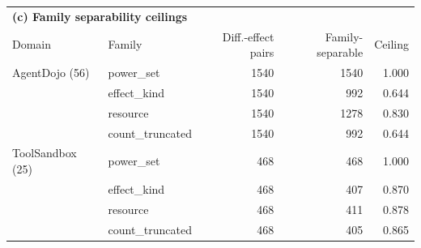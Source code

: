 \begin{table}[t]
\par\vspace{2mm}
\begin{tabular}{llrrr}
\toprule
\multicolumn{5}{l}{\textbf{(c) Family separability ceilings}} \\
Domain & Family & Diff.-effect pairs & Family-separable & Ceiling \\
\midrule
AgentDojo (56)      & power\_set       & 1540 & 1540 & 1.000 \\
                    & effect\_kind     & 1540 & 992  & 0.644 \\
                    & resource         & 1540 & 1278 & 0.830 \\
                    & count\_truncated & 1540 & 992  & 0.644 \\
\midrule
ToolSandbox (25)    & power\_set       & 468  & 468  & 1.000 \\
                    & effect\_kind     & 468  & 407  & 0.870 \\
                    & resource         & 468  & 411  & 0.878 \\
                    & count\_truncated & 468  & 405  & 0.865 \\
\bottomrule
\end{tabular}
\end{table}

%
